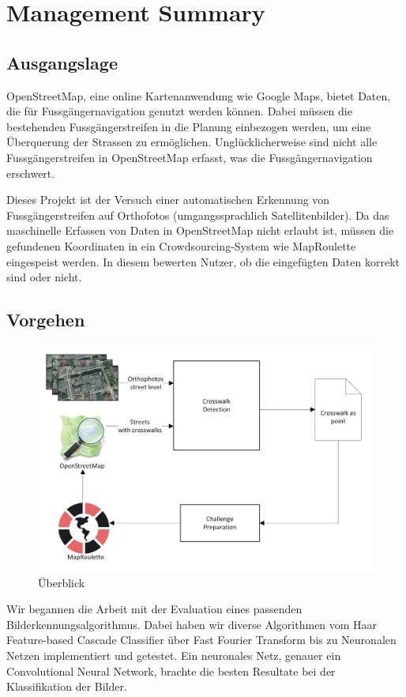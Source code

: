 \section{Management Summary}
\subsection*{Ausgangslage}
OpenStreetMap, eine online Kartenanwendung wie Google Maps, bietet Daten, die für Fussgängernavigation genutzt werden können. Dabei müssen die bestehenden Fussgängerstreifen in die Planung einbezogen werden, um eine Überquerung der Strassen zu ermöglichen. Unglücklicherweise sind nicht alle Fussgängerstreifen in OpenStreetMap erfasst, was die Fussgängernavigation erschwert.

Dieses Projekt ist der Versuch einer automatischen Erkennung von Fussgängerstreifen auf Orthofotos (umgangssprachlich Satellitenbilder). Da das maschinelle Erfassen von Daten in OpenStreetMap nicht erlaubt ist, müssen die gefundenen Koordinaten in ein Crowdsourcing-System wie MapRoulette eingespeist werden. In diesem bewerten Nutzer, ob die eingefügten Daten korrekt sind oder nicht.

\subsection*{Vorgehen}
\begin{figure}[H]
	\centering
	\includegraphics[width=410pt]{images/management_summary_1.png}
	\caption[Management Summery Überblick]{Überblick}
\end{figure}
Wir begannen die Arbeit mit der Evaluation eines passenden Bilderkennungsalgorithmus. Dabei haben wir diverse Algorithmen vom Haar Feature-based Cascade Classifier über Fast Fourier Transform bis zu Neuronalen Netzen implementiert und getestet. Ein neuronales Netz, genauer ein Convolutional Neural Network, brachte die besten Resultate bei der Klassifikation der Bilder.

